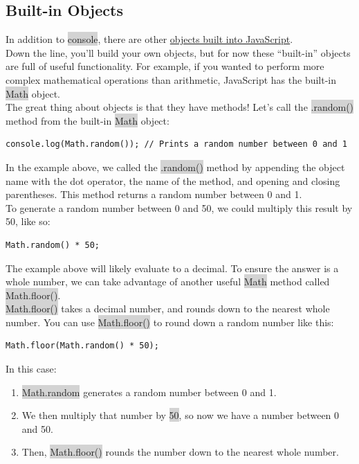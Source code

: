 \documentclass[11pt]{article}
\begin{document}
\subsection{Built-in Objects}
In addition to \colorbox{lightgray}{console}, there are other \href{https://developer.mozilla.org/en-US/docs/Web/JavaScript/Reference/Global_Objects}{objects built into JavaScript}. \\
Down the line, you’ll build your own objects, but for now these “built-in” objects are full of useful functionality.
For example, if you wanted to perform more complex mathematical operations than arithmetic, JavaScript has the built-in \colorbox{lightgray}{Math} object. \\
\newline
The great thing about objects is that they have methods! Let’s call the \colorbox{lightgray}{.random()} method from the built-in \colorbox{lightgray}{Math} object:
\begin{lstlisting}
console.log(Math.random()); // Prints a random number between 0 and 1
\end{lstlisting}
In the example above, we called the \colorbox{lightgray}{.random()} method by appending the object name with the dot operator, the name of the method, and opening and closing parentheses. This method returns a random number between 0 and 1. \\
\newline
To generate a random number between 0 and 50, we could multiply this result by 50, like so:
\begin{lstlisting}
Math.random() * 50;
\end{lstlisting}
The example above will likely evaluate to a decimal. To ensure the answer is a whole number, we can take advantage of another useful \colorbox{lightgray}{Math} method called \colorbox{lightgray}{Math.floor()}. \\
\newline
\colorbox{lightgray}{Math.floor()} takes a decimal number, and rounds down to the nearest whole number. You can use \colorbox{lightgray}{Math.floor()} to round down a random number like this:
\begin{lstlisting}
Math.floor(Math.random() * 50);
\end{lstlisting}
In this case: 
\begin{enumerate}[leftmargin = *]
\item \colorbox{lightgray}{Math.random} generates a random number between 0 and 1.
\item We then multiply that number by \colorbox{lightgray}{50}, so now we have a number between 0 and 50.
\item Then, \colorbox{lightgray}{Math.floor()} rounds the number down to the nearest whole number.
\end{enumerate}
\end{document}
